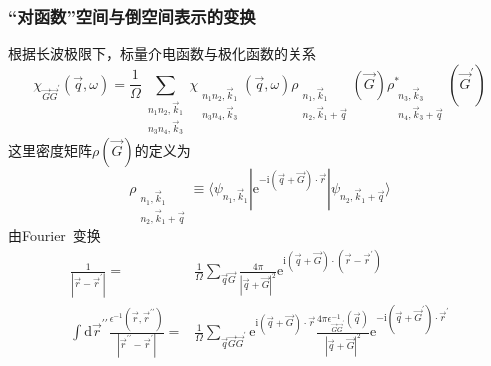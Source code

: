 \documentclass[cjk,slidestop,compress,mathserif,blue]{beamer}
\begin{document}
\frame
{
	\frametitle{“对函数”空间与倒空间表示的变换}
	根据长波极限下，标量介电函数与极化函数的关系
	\begin{displaymath}
		\chi_{\vec G\vec G^{\prime}}(\vec q,\omega)=\frac1{\Omega}\sum_{\substack{n_1n_2,\vec k_1\\n_3n_4,\vec k_3}}\chi_{\substack{n_1n_2,\vec k_1\\n_3n_4,\vec k_3}}(\vec q,\omega)\rho_{\substack{n_1,\vec k_1\\n_2,\vec k_1+\vec q}}(\vec G)\rho_{\substack{n_3,\vec k_3\\n_4,\vec k_3+\vec q}}^{\ast}(\vec G^{\prime})
	\end{displaymath}
这里密度矩阵$\rho(\vec G)$的定义为
\begin{displaymath}
	\rho_{\substack{n_1,\vec k_1\\n_2,\vec k_1+\vec q}}\equiv\langle\psi_{n_1,\vec k_1}|\mathrm{e}^{-\mathrm{i}(\vec q+\vec G)\cdot\vec r}|\psi_{n_2,\vec k_1+\vec q}\rangle
\end{displaymath}
由\textrm{Fourier~}变换
\begin{displaymath}
	\begin{aligned}
		\frac1{|\vec r-\vec r^{\prime}|}=&\frac1{\Omega}\sum_{\vec q\vec G}\frac{4\pi}{|\vec q+\vec G|^2}\mathrm{e}^{\mathrm{i}(\vec q+\vec G)\cdot(\vec r-\vec r^{\prime})}\\
		\int\mathrm{d}\vec r^{\prime\prime}\frac{\epsilon^{-1}(\vec r,\vec r^{\prime\prime})}{|\vec r^{\prime\prime}-\vec r^{\prime}|}=&\frac1{\Omega}\sum_{\vec q\vec G\vec G^{\prime}}\mathrm{e}^{\mathrm{i}(\vec q+\vec G)\cdot\vec r}\frac{4\pi\epsilon_{\vec G\vec G^{\prime}}^{-1}(\vec q)}{|\vec q+\vec G|^2}\mathrm{e}^{-\mathrm{i}(\vec q+\vec G^{\prime})\cdot\vec r^{\prime}}
	\end{aligned}
\end{displaymath}
}
\end{document}

